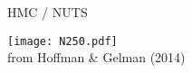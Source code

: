 \documentclass[finnish,english,t]{beamer}
\begin{document}









\begin{frame}{HMC / NUTS}

  \vspace{-.5\baselineskip}
  \texttt{[image: N250.pdf]}\\
  {\scriptsize from Hoffman \& Gelman (2014)}

\end{frame}



\end{document}
